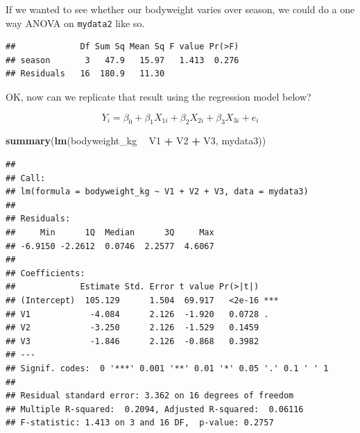 \documentclass[]{book}
\newenvironment{Shaded}{\begin{snugshade}}{\end{snugshade}}
\newcommand{\CommentTok}[1]{\textcolor[rgb]{0.56,0.35,0.01}{\textit{#1}}}
\newcommand{\DataTypeTok}[1]{\textcolor[rgb]{0.13,0.29,0.53}{#1}}
\newcommand{\KeywordTok}[1]{\textcolor[rgb]{0.13,0.29,0.53}{\textbf{#1}}}
\newcommand{\NormalTok}[1]{#1}
\newcommand{\OperatorTok}[1]{\textcolor[rgb]{0.81,0.36,0.00}{\textbf{#1}}}
\newcommand{\StringTok}[1]{\textcolor[rgb]{0.31,0.60,0.02}{#1}}
\begin{document}
If we wanted to see whether our bodyweight varies over season, we could do a one way ANOVA on \texttt{mydata2} like so.

\begin{Shaded}
\end{Shaded}

\begin{verbatim}
##             Df Sum Sq Mean Sq F value Pr(>F)
## season       3   47.9   15.97   1.413  0.276
## Residuals   16  180.9   11.30
\end{verbatim}

OK, now can we replicate that result using the regression model below?

\[Y_i = \beta_0 + \beta_1 X_{1i} + \beta_2 X_{2i} + \beta_3 X_{3i} + e_i\]

\begin{Shaded}
\begin{Highlighting}[]
\KeywordTok{summary}\NormalTok{(}\KeywordTok{lm}\NormalTok{(bodyweight_kg }\OperatorTok{~}\StringTok{ }\NormalTok{V1 }\OperatorTok{+}\StringTok{ }\NormalTok{V2 }\OperatorTok{+}\StringTok{ }\NormalTok{V3, mydata3))}
\end{Highlighting}
\end{Shaded}

\begin{verbatim}
## 
## Call:
## lm(formula = bodyweight_kg ~ V1 + V2 + V3, data = mydata3)
## 
## Residuals:
##     Min      1Q  Median      3Q     Max 
## -6.9150 -2.2612  0.0746  2.2577  4.6067 
## 
## Coefficients:
##             Estimate Std. Error t value Pr(>|t|)    
## (Intercept)  105.129      1.504  69.917   <2e-16 ***
## V1            -4.084      2.126  -1.920   0.0728 .  
## V2            -3.250      2.126  -1.529   0.1459    
## V3            -1.846      2.126  -0.868   0.3982    
## ---
## Signif. codes:  0 '***' 0.001 '**' 0.01 '*' 0.05 '.' 0.1 ' ' 1
## 
## Residual standard error: 3.362 on 16 degrees of freedom
## Multiple R-squared:  0.2094,	Adjusted R-squared:  0.06116 
## F-statistic: 1.413 on 3 and 16 DF,  p-value: 0.2757
\end{verbatim}
\end{document}
